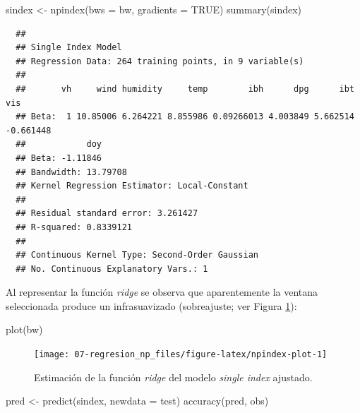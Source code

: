 \documentclass[
]{book}
\newenvironment{Shaded}{\begin{snugshade}}{\end{snugshade}}
\newcommand{\AttributeTok}[1]{\textcolor[rgb]{0.77,0.63,0.00}{#1}}
\newcommand{\ConstantTok}[1]{\textcolor[rgb]{0.00,0.00,0.00}{#1}}
\newcommand{\FunctionTok}[1]{\textcolor[rgb]{0.00,0.00,0.00}{#1}}
\newcommand{\NormalTok}[1]{#1}
\newcommand{\OtherTok}[1]{\textcolor[rgb]{0.56,0.35,0.01}{#1}}
\theoremstyle{break}
\theoremstyle{nonumberplain}
\begin{document}
\begin{Shaded}
\begin{Highlighting}[]
\NormalTok{sindex }\OtherTok{\textless{}{-}} \FunctionTok{npindex}\NormalTok{(}\AttributeTok{bws =}\NormalTok{ bw, }\AttributeTok{gradients =} \ConstantTok{TRUE}\NormalTok{)}
\FunctionTok{summary}\NormalTok{(sindex)}
\end{Highlighting}
\end{Shaded}

\begin{verbatim}
  ## 
  ## Single Index Model
  ## Regression Data: 264 training points, in 9 variable(s)
  ## 
  ##       vh     wind humidity     temp        ibh      dpg      ibt       vis
  ## Beta:  1 10.85006 6.264221 8.855986 0.09266013 4.003849 5.662514 -0.661448
  ##            doy
  ## Beta: -1.11846
  ## Bandwidth: 13.79708
  ## Kernel Regression Estimator: Local-Constant
  ## 
  ## Residual standard error: 3.261427
  ## R-squared: 0.8339121
  ## 
  ## Continuous Kernel Type: Second-Order Gaussian
  ## No. Continuous Explanatory Vars.: 1
\end{verbatim}

Al representar la función \emph{ridge} se observa que aparentemente la ventana seleccionada produce un infrasuavizado (sobreajuste; ver Figura \ref{fig:npindex-plot}):



\begin{Shaded}
\begin{Highlighting}[]
\FunctionTok{plot}\NormalTok{(bw)}
\end{Highlighting}
\end{Shaded}

\begin{figure}[!htb]

{\centering \texttt{[image: 07-regresion\_np\_files/figure-latex/npindex-plot-1]} 

}

\caption{Estimación de la función \emph{ridge} del modelo \emph{single index} ajustado.}\label{fig:npindex-plot}
\end{figure}

\begin{Shaded}
\begin{Highlighting}[]
\NormalTok{pred }\OtherTok{\textless{}{-}} \FunctionTok{predict}\NormalTok{(sindex, }\AttributeTok{newdata =}\NormalTok{ test)}
\FunctionTok{accuracy}\NormalTok{(pred, obs)}
\end{Highlighting}
\end{Shaded}
\end{document}
